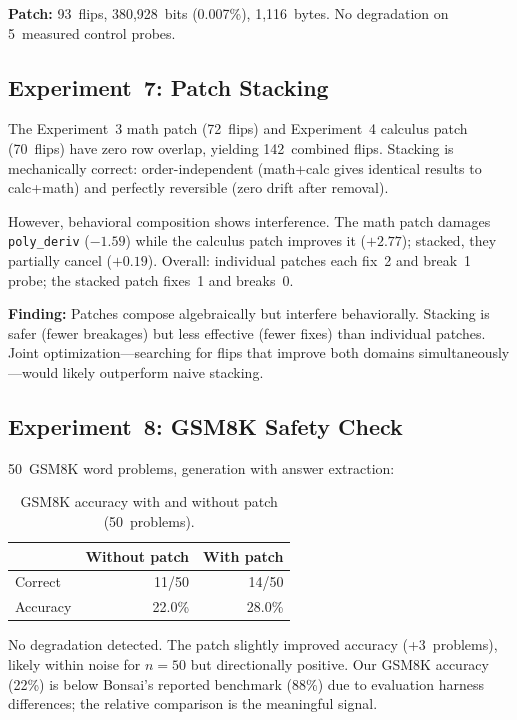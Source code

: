 \documentclass[11pt,a4paper]{article}
\begin{document}
\textbf{Patch:} 93~flips, 380,928~bits (0.007\%), 1,116~bytes.
No degradation on 5~measured control probes.

\subsection{Experiment~7: Patch Stacking}

The Experiment~3 math patch (72~flips) and Experiment~4 calculus patch
(70~flips) have zero row overlap, yielding 142~combined flips.
Stacking is mechanically correct: order-independent (math+calc gives
identical results to calc+math) and perfectly reversible (zero drift
after removal).

However, behavioral composition shows interference. The math patch
damages \texttt{poly\_deriv} ($-1.59$) while the calculus patch improves
it ($+2.77$); stacked, they partially cancel ($+0.19$). Overall:
individual patches each fix~2 and break~1 probe; the stacked patch
fixes~1 and breaks~0.

\textbf{Finding:} Patches compose algebraically but interfere
behaviorally. Stacking is safer (fewer breakages) but less effective
(fewer fixes) than individual patches. Joint optimization---searching
for flips that improve both domains simultaneously---would likely
outperform naive stacking.

\subsection{Experiment~8: GSM8K Safety Check}

50~GSM8K word problems, generation with answer extraction:

\begin{table}[h]
\centering
\caption{GSM8K accuracy with and without patch (50~problems).}
\begin{tabular}{@{}lrr@{}}
\toprule
& Without patch & With patch \\
\midrule
Correct & 11/50 & 14/50 \\
Accuracy & 22.0\% & 28.0\% \\
\bottomrule
\end{tabular}
\end{table}

No degradation detected. The patch slightly improved accuracy (+3~problems),
likely within noise for $n=50$ but directionally positive. Our GSM8K accuracy (22\%) is below Bonsai's reported benchmark (88\%)
due to evaluation harness differences; the relative comparison is the
meaningful signal.
\end{document}
